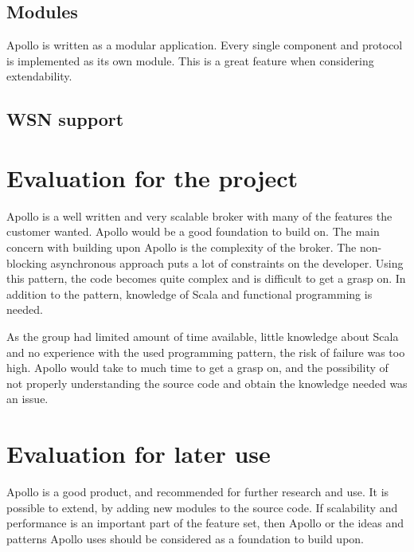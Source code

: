 \subsection{Modules}
Apollo is written as a modular application. Every single component and protocol is implemented as its own module. This is a great feature when considering extendability. 

\subsection{WSN support}

\section{Evaluation for the project}
Apollo is a well written and very scalable broker with many of the features the customer wanted. Apollo would be a good foundation to build on. The main concern with building upon Apollo is the complexity of the broker. The non-blocking asynchronous approach puts a lot of constraints on the developer. Using this pattern, the code becomes quite complex and is difficult to get a grasp on. In addition to the pattern, knowledge of Scala and functional programming is needed. 

As the group had limited amount of time available, little knowledge about Scala and no experience with the used programming pattern, the risk of failure was too high. Apollo would take to much time to get a grasp on, and the possibility of not properly understanding the source code and obtain the knowledge needed was an issue.

\section{Evaluation for later use}

Apollo is a good product, and recommended for further research and use. It is possible to extend, by adding new modules to the source code. If scalability and performance is an important part of the feature set, then Apollo or the ideas and patterns Apollo uses should be considered as a foundation to build upon.

\clearpage

